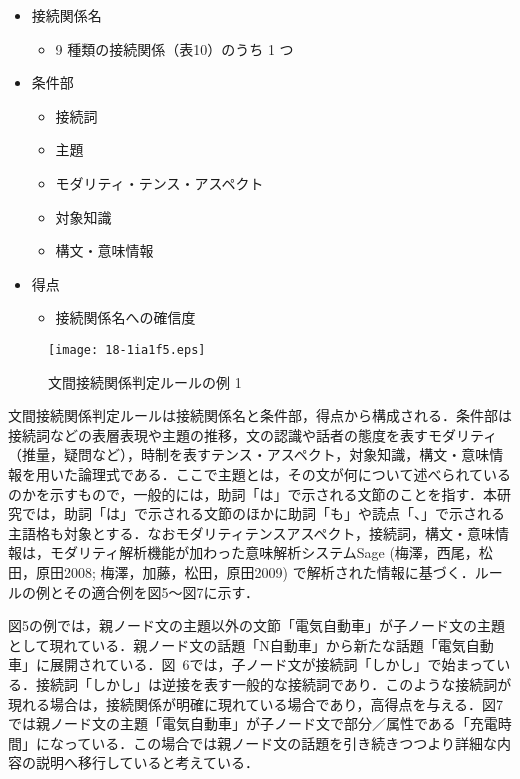 \documentclass[japanese]{jnlp_1.4}
\begin{document}
\begin{itemize}
\item 接続関係名
	\begin{itemize}
	\item 9 種類の接続関係（表10）のうち 1 つ
	\end{itemize}
\item 条件部
	\begin{itemize}
	\item 接続詞
	\item 主題
	\item モダリティ・テンス・アスペクト
	\item 対象知識
	\item 構文・意味情報
	\end{itemize}
\item 得点
	\begin{itemize}
	\item 接続関係名への確信度
	\end{itemize}
\end{itemize}
\vspace{1\baselineskip}

\begin{figure}[b]
\begin{center}
\texttt{[image: 18-1ia1f5.eps]}
\end{center}
\caption{文間接続関係判定ルールの例 1}
\end{figure}

文間接続関係判定ルールは接続関係名と条件部，得点から構成される．条件部は接続詞などの表層表現や主題の推移，文の認識や話者の態度を表すモダリティ（推量，疑問など），時制を表すテンス・アスペクト，対象知識，構文・意味情報を用いた論理式である．ここで主題とは，その文が何について述べられているのかを示すもので，一般的には，助詞「は」で示される文節のことを指す．本研究では，助詞「は」で示される文節のほかに助詞「も」や読点「、」で示される主語格も対象とする．なおモダリティテンスアスペクト，接続詞，構文・意味情報は，モダリティ解析機能が加わった意味解析システムSage (梅澤，西尾，松田，原田2008; 梅澤，加藤，松田，原田2009) で解析された情報に基づく．ルールの例とその適合例を図5〜図7に示す．

図5の例では，親ノード文の主題以外の文節「電気自動車」が子ノード文の主題として現れている．親ノード文の話題「N自動車」から新たな話題「電気自動車」に展開されている．図~6では，子ノード文が接続詞「しかし」で始まっている．接続詞「しかし」は逆接を表す一般的な接続詞であり．このような接続詞が現れる場合は，接続関係が明確に現れている場合であり，高得点を与える．図7では親ノード文の主題「電気自動車」が子ノード文で部分／属性である「充電時間」になっている．この場合では親ノード文の話題を引き続きつつより詳細な内容の説明へ移行していると考えている．
\end{document}
